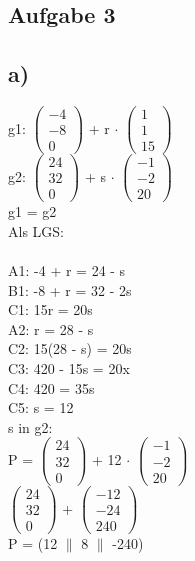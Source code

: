 \documentclass{article}
\begin{document}
	\subsection*{Aufgabe 3}
	\subsection*{a)}
	g1:
	$\left(
	\begin{array}{c}
	-4 \\ -8 \\ 0
	\end{array}
	\right)$
	+
	r
	$\cdot$
	$\left(
	\begin{array}{c}
	1 \\ 1 \\ 15
	\end{array}
	\right)$ \\
	g2:
	$\left(
	\begin{array}{c}
	24 \\ 32 \\ 0
	\end{array}
	\right)$
	+
	s
	$\cdot$
	$\left(
	\begin{array}{c}
	-1 \\ -2 \\ 20
	\end{array}
	\right)$ \\
	g1 = g2 \\
	Als LGS: \\ \\
	A1: -4 + r = 24 - s \\
	B1: -8 + r = 32 - 2s \\
	C1: 15r = 20s \\
	A2: r = 28 - s \\
	C2: 15(28 - s) = 20s \\
	C3: 420 - 15s = 20x \\
	C4: 420 = 35s \\
	C5: s = 12 \\
	s in g2: \\
	P = 
	$\left(
	\begin{array}{c}
	24 \\ 32 \\ 0
	\end{array}
	\right)$
	+
	12
	$\cdot$
	$\left(
	\begin{array}{c}
	-1 \\ -2 \\ 20
	\end{array}
	\right)$ \\
	$\left(
	\begin{array}{c}
	24 \\ 32 \\ 0
	\end{array}
	\right)$
	+
	$\left(
	\begin{array}{c}
	-12 \\ -24 \\ 240
	\end{array}
	\right)$ \\
	P = (12 $\|$ 8 $\|$ -240)
\end{document}
